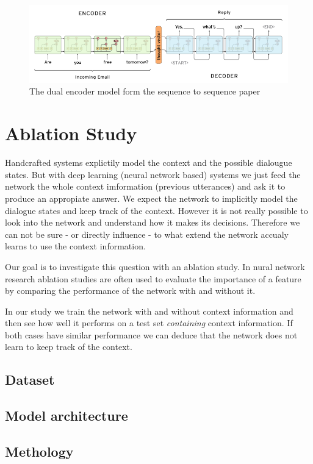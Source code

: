 \documentclass[conference]{IEEEtran}
\begin{document}
\begin{figure}[H]
\centering
   \includegraphics[width=\linewidth]{sequence_to_sequence.png}
  \caption{The dual encoder model form the sequence to sequence paper\cite{sutskever2014sequence}}
  \label{fig:dstChallengeProbabilistic}
\end{figure}

\section{Ablation Study}
Handcrafted systems explictily model the context and the possible dialougue states. But with deep learning (neural network based) systems we just feed the network the whole context imformation (previous utterances) and ask it to produce an appropiate answer. We expect the network to implicitly model the dialogue states and keep track of the context. However it is not really possible to look into the network and understand how it makes its decisions. Therefore we can not be sure - or directly influence - to what extend the network accualy learns to use the context information.

Our goal is to investigate this question with an ablation study. In nural network research ablation studies are often used to evaluate the importance of a feature by comparing the performance of the network with and without it.

In our study we train the network with and without context information and then see how well it performs on a test set \emph{containing} context information. If both cases have similar performance we can deduce that the network does not learn to keep track of the context.

\subsection{Dataset}
\subsection{Model architecture}
\subsection{Methology}
\end{document}
